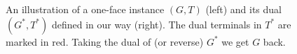 \documentclass[11pt]{article}
\theoremstyle{definition}
\begin{document}
\begin{figure}[h]
	\centering
	\hspace{0.7cm}
	\caption{An illustration of a one-face instance $(G,T)$ (left) and its dual $(G^*,T^*)$ defined in our way (right). The dual terminals in $T^*$ are marked in red. Taking the dual of (or reverse) $G^*$ we get $G$ back.\label{fig: dual}}
\end{figure}
\end{document}
